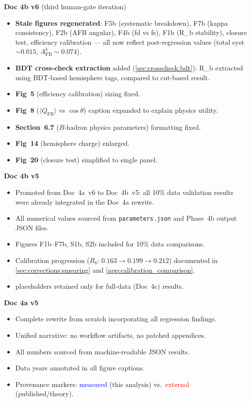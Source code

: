 \documentclass[11pt,a4paper]{article}
\newcommand{\tbd}[1]{\textcolor{gray}{\textit{#1}}}
\newcommand{\measured}[1]{\textcolor{blue}{#1}}
\newcommand{\external}[1]{\textcolor{red}{#1}}
\begin{document}
\textbf{Doc 4b v6} (third human-gate iteration)
\begin{itemize}
\item \textbf{Stale figures regenerated}: F5b (systematic breakdown),
  F7b (kappa consistency), F2b (AFB angular), F4b (fd vs fs), F1b (R\_b
  stability), closure test, efficiency calibration --- all now reflect
  post-regression values (total syst $\sim 0.015$, $A_\text{FB}^b \sim 0.074$).
\item \textbf{BDT cross-check extraction} added (\cref{sec:crosscheck:bdt}):
  R\_b extracted using BDT-based hemisphere tags, compared to cut-based result.
\item \textbf{Fig~5} (efficiency calibration) sizing fixed.
\item \textbf{Fig~8} ($\langle Q_\text{FB}\rangle$ vs $\cos\theta$) caption
  expanded to explain physics utility.
\item \textbf{Section~6.7} ($B$-hadron physics parameters) formatting fixed.
\item \textbf{Fig~14} (hemisphere charge) enlarged.
\item \textbf{Fig~20} (closure test) simplified to single panel.
\end{itemize}

\textbf{Doc 4b v5}
\begin{itemize}
\item Promoted from Doc~4a~v6 to Doc~4b~v5: all 10\% data validation
  results were already integrated in the Doc~4a rewrite.
\item All numerical values sourced from \texttt{parameters.json} and
  Phase~4b output JSON files.
\item Figures F1b--F7b, S1b, S2b included for 10\% data comparisons.
\item Calibration progression ($R_b$: $0.163 \to 0.199 \to 0.212$)
  documented in \cref{sec:corrections:smearing} and \cref{app:calibration_comparison}.
\item \tbd{} placeholders retained only for full-data (Doc~4c) results.
\end{itemize}

\textbf{Doc 4a v5}
\begin{itemize}
\item Complete rewrite from scratch incorporating all regression findings.
\item Unified narrative: no workflow artifacts, no patched appendices.
\item All numbers sourced from machine-readable JSON results.
\item Data years annotated in all figure captions.
\item Provenance markers: \measured{measured} (this analysis) vs.\ \external{external} (published/theory).
\end{itemize}
\end{document}

